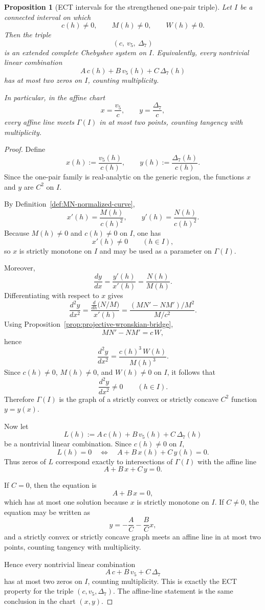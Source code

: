 \documentclass[11pt,a4paper]{amsart}
\theoremstyle{plain}
\newtheorem{proposition}[theorem]{Proposition}
\theoremstyle{definition}
\begin{document}
\begin{proposition}[ECT intervals for the strengthened one-pair triple]
\label{prop:ect-intervals-c-v5-delta7}
Let $I$ be a connected interval on which
\[
c(h)\neq 0,
\qquad
M(h)\neq 0,
\qquad
W(h)\neq 0.
\]
Then the triple
\[
(c,\ v_5,\ \Delta_7)
\]
is an extended complete Chebyshev system on $I$. Equivalently, every
nontrivial linear combination
\[
A\,c(h)+B\,v_5(h)+C\,\Delta_7(h)
\]
has at most two zeros on $I$, counting multiplicity.

In particular, in the affine chart
\[
x=\frac{v_5}{c},\qquad y=\frac{\Delta_7}{c},
\]
every affine line meets $\Gamma(I)$ in at most two points, counting
tangency with multiplicity.
\end{proposition}

\begin{proof}
Define
\[
x(h):=\frac{v_5(h)}{c(h)},
\qquad
y(h):=\frac{\Delta_7(h)}{c(h)}.
\]
Since the one-pair family is real-analytic on the generic region, the
functions $x$ and $y$ are $C^2$ on $I$.

By Definition~\ref{def:MN-normalized-curve},
\[
x'(h)=\frac{M(h)}{c(h)^2},
\qquad
y'(h)=\frac{N(h)}{c(h)^2}.
\]
Because $M(h)\neq 0$ and $c(h)\neq 0$ on $I$, one has
\[
x'(h)\neq 0
\qquad (h\in I),
\]
so $x$ is strictly monotone on $I$ and may be used as a parameter on
$\Gamma(I)$.

Moreover,
\[
\frac{dy}{dx}=\frac{y'(h)}{x'(h)}=\frac{N(h)}{M(h)}.
\]
Differentiating with respect to $x$ gives
\[
\frac{d^2y}{dx^2}
=
\frac{\frac{d}{dh}\bigl(N/M\bigr)}{x'(h)}
=
\frac{(M N'-N M')/M^2}{M/c^2}.
\]
Using Proposition~\ref{prop:projective-wronskian-bridge},
\[
M N'-N M'=c\,W,
\]
hence
\[
\frac{d^2y}{dx^2}
=
\frac{c(h)^3\,W(h)}{M(h)^3}.
\]
Since $c(h)\neq 0$, $M(h)\neq 0$, and $W(h)\neq 0$ on $I$, it follows that
\[
\frac{d^2y}{dx^2}\neq 0
\qquad (h\in I).
\]
Therefore $\Gamma(I)$ is the graph of a strictly convex or strictly concave
$C^2$ function $y=y(x)$.

Now let
\[
L(h):=A\,c(h)+B\,v_5(h)+C\,\Delta_7(h)
\]
be a nontrivial linear combination. Since $c(h)\neq 0$ on $I$,
\[
L(h)=0
\quad\Longleftrightarrow\quad
A+B\,x(h)+C\,y(h)=0.
\]
Thus zeros of $L$ correspond exactly to intersections of $\Gamma(I)$ with the
affine line
\[
A+B\,x+C\,y=0.
\]

If $C=0$, then the equation is
\[
A+B\,x=0,
\]
which has at most one solution because $x$ is strictly monotone on $I$.
If $C\neq 0$, the equation may be written as
\[
y=-\frac{A}{C}-\frac{B}{C}x,
\]
and a strictly convex or strictly concave graph meets an affine line in at
most two points, counting tangency with multiplicity.

Hence every nontrivial linear combination
\[
A\,c+B\,v_5+C\,\Delta_7
\]
has at most two zeros on $I$, counting multiplicity. This is exactly the ECT
property for the triple $(c,v_5,\Delta_7)$. The affine-line statement is the
same conclusion in the chart $(x,y)$.
\end{proof}
\end{document}
